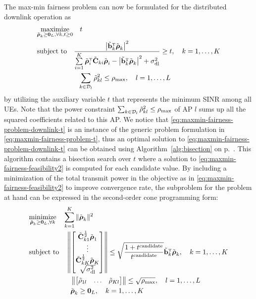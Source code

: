 \pagebreak
The max-min fairness problem can now be formulated for the distributed downlink operation as
\begin{align} \label{eq:maxmin-fairness-problem-downlink-t}
&\underset{\tilde{\boldsymbol{\rho}}_k\geq \vect{0}_L, \forall k, t \geq 0}{\textrm{maximize}} \quad t \\
&\textrm{subject to} \quad  \frac{\left|\tilde{\vect{b}}_k^{\Ttran}\tilde{\boldsymbol{\rho}}_k\right|^2}{\sum\limits_{i=1}^K\tilde{\boldsymbol{\rho}}_i^{\Ttran}\tilde{\vect{C}}_{ki}\tilde{\boldsymbol{\rho}}_i-\left|\tilde{\vect{b}}_k^{\Ttran}\tilde{\boldsymbol{\rho}}_k\right|^2+\sigmaDL}\geq t, \quad k=1,\ldots,K \nonumber \\
&\hspace{21mm} \sum_{k\in \mathcal{D}_l}\tilde{\rho}_{kl}^2\leq \rhomax, \quad l=1,\ldots,L\nonumber
\end{align}
by utilizing the auxiliary variable $t$ that represents the minimum SINR among all UEs. Note that the power constraint 
$\sum_{k\in \mathcal{D}_l}\tilde{\rho}_{kl}^2\leq \rho_{\textrm{max}}$ of AP $l$ sums up all the squared coefficients related to this AP.
We notice that \eqref{eq:maxmin-fairness-problem-downlink-t} is an instance of the generic problem formulation in \eqref{eq:maxmin-fairness-problem-t}, thus an optimal solution to \eqref{eq:maxmin-fairness-problem-downlink-t} can be obtained using Algorithm~\ref{alg:bisection} on p.~\pageref{alg:bisection}. 
This algorithm contains a bisection search over $t$ where a solution to \eqref{eq:maxmin-fairness-feasibility2} is computed for each candidate value. By including a minimization of the total transmit power in the objective as in \eqref{eq:maxmin-fairness-feasibility2} to improve convergence rate, the subproblem for the problem at hand can be expressed in the second-order cone programming form:
\begin{align} \label{eq:maxmin-fairness-feasibility-downlink}
&\underset{\tilde{\boldsymbol{\rho}}_k\geq \vect{0}_L, \forall k}{\textrm{minimize}} \quad \sum_{k=1}^{K} \| \tilde{\boldsymbol{\rho}}_k\|^2  \\
&\textrm{subject to} \quad   \left \Vert \begin{bmatrix}   \tilde{\vect{C}}_{k1}^{\frac12}\tilde{\boldsymbol{\rho}}_1 \\ \vdots \\ \tilde{\vect{C}}_{kK}^{\frac12}\tilde{\boldsymbol{\rho}}_K \\ \sqrt{\sigmaDL} \end{bmatrix} \right \Vert \leq \sqrt{\frac{1+ t^{\rm candidate}}{ t^{\rm candidate}}}\tilde{\vect{b}}_k^{\Ttran}\tilde{\boldsymbol{\rho}}_k, \quad k=1,\ldots,K \nonumber \\
&\hspace{21mm} \left\| \begin{bmatrix}  \tilde{\rho}_{1l} & \ldots &  \tilde{\rho}_{Kl} \end{bmatrix}  \right\| \leq \sqrt{\rhomax}, \quad l=1,\ldots,L \nonumber \\
&\hspace{21mm} \tilde{\boldsymbol{\rho}}_k \geq \vect{0}_L, \quad k=1,\ldots,K \nonumber
\end{align}
